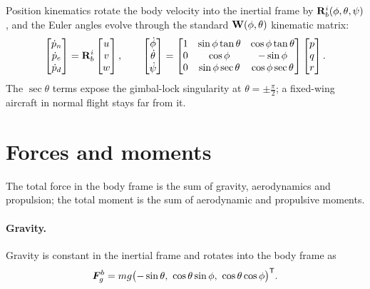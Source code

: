 Position kinematics rotate the body velocity into the inertial frame by
$\mathbf{R}_b^i(\phi,\theta,\psi)$, and the Euler angles evolve through the standard
$\mathbf{W}(\phi,\theta)$ kinematic matrix:
\begin{equation}
\begin{bmatrix}\dot p_n\\\dot p_e\\\dot p_d\end{bmatrix}
=\mathbf{R}_b^i\begin{bmatrix}u\\v\\w\end{bmatrix},
\qquad
\begin{bmatrix}\dot\phi\\\dot\theta\\\dot\psi\end{bmatrix}
=\begin{bmatrix}
1 & \sin\phi\tan\theta & \cos\phi\tan\theta\\
0 & \cos\phi & -\sin\phi\\
0 & \sin\phi\sec\theta & \cos\phi\sec\theta
\end{bmatrix}
\begin{bmatrix}p\\q\\r\end{bmatrix}.
\label{eq:fw-kin}
\end{equation}
The $\sec\theta$ terms expose the gimbal-lock singularity at $\theta=\pm\tfrac\pi2$;
a fixed-wing aircraft in normal flight stays far from it.

\section{Forces and moments}

The total force in the body frame is the sum of gravity, aerodynamics and
propulsion; the total moment is the sum of aerodynamic and propulsive moments.

\paragraph{Gravity.} Gravity is constant in the inertial frame and rotates into
the body frame as
\begin{equation}
\bm{F}_g^{b}=m g\bigl(-\sin\theta,\ \cos\theta\sin\phi,\ \cos\theta\cos\phi\bigr)^{\mathsf{T}}.
\label{eq:fw-grav}
\end{equation}

